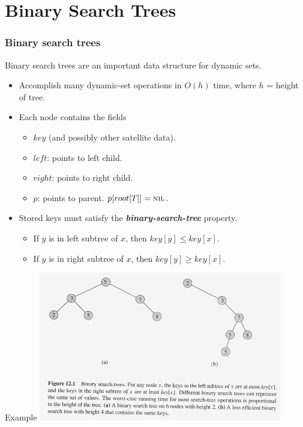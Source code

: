 \documentclass[notes,serif]{beamer}
\begin{document}
\section{Binary Search Trees}
\begin{frame}
  \frametitle{Binary search trees}
  Binary search trees are an important data structure for dynamic sets.
  \begin{itemize}
    \item Accomplish many dynamic-set operations in $O(h)$ time, where $h$ = height of
tree.
    \item Each node contains the fields
    \begin{itemize}
      \item $key$ (and possibly other satellite data).
      \item $left$: points to left child.
      \item $right$: points to right child.
      \item $p$: points to parent. $p[root[T ]] = \textsc{nil}$.
    \end{itemize}
    \item Stored keys must satisfy the {\bf \em binary-search-tree} property.
    \begin{itemize}
      \item If $y$ is in left subtree of $x$, then $key[y]  \leq key[x]$.
      \item If $y$ is in right subtree of $x$, then $key[y] \ge key[x]$.
    \end{itemize}
  \end{itemize}
\end{frame}

\begin{frame}
  \begin{block}{Example}
    \includegraphics[height=6.5cm]{12-binary-serach-trees.png}
  \end{block}
\end{frame}
\end{document}
